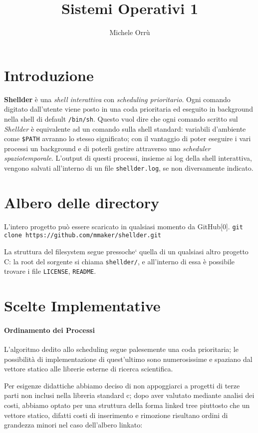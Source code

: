 \documentclass[11pt]{article}
\title{\textbf{Sistemi Operativi 1}}
\author{Michele Orr\`u}
\date{}
\begin{document}
\maketitle

\section{Introduzione}

\textbf{Shellder} \`e una \emph{shell interattiva} con \emph{scheduling prioritario}.
Ogni comando digitato dall'utente viene posto in una coda prioritaria ed eseguito in background nella shell di
default \texttt{/bin/sh}. Questo vuol dire che ogni comando scritto sul \emph{Shellder} \`e equivalente ad un
comando sulla shell standard: variabili d'ambiente come \texttt{\$PATH} avranno lo stesso significato;
con il vantaggio di poter eseguire i vari processi un background e di poterli gestire attraverso uno 
\emph{scheduler spaziotemporale}.
L'output di questi processi, insieme ai log della shell interattiva, vengono salvati all'interno di un file 
\texttt{shellder.log}, se non diversamente indicato.

\section{Albero delle directory}

L'intero progetto pu\`o essere scaricato in qualsiasi momento da GitHub[0].
\texttt{git clone https://github.com/mmaker/shellder.git}

La struttura del filesystem segue pressoche` quella di un qualsiasi altro progetto C: la root del sorgente si chiama \texttt{shellder/}, e all'interno di essa \`e possibile trovare i file \texttt{LICENSE}, \texttt{README}.


\section{Scelte Implementative}

\paragraph{Ordinamento dei Processi\\}
L'algoritmo dedito allo scheduling segue palesemente una coda prioritaria;
le possibilit\`a di implementazione di quest'ultimo sono numerosissime e
spaziano dal vettore statico alle librerie esterne di ricerca scientifica.

Per esigenze didattiche abbiamo deciso di non appoggiarci a progetti di terze
parti non inclusi nella libreria standard c; dopo aver valutato mediante analisi
dei costi, abbiamo optato per una struttura della forma linked tree piuttosto
che un vettore statico, difatti costi di inserimento e rimozione risultano
ordini di grandezza minori nel caso dell'albero linkato:
\end{document}
